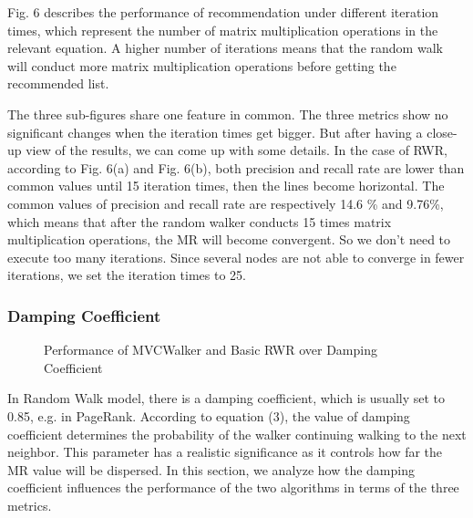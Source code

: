 \documentclass[10pt,journal,compsoc]{IEEEtran}
\begin{document}
Fig. 6 describes the performance of recommendation under different iteration times, which represent the number of matrix multiplication operations in the relevant equation. A higher number of iterations means that the random walk will conduct more matrix multiplication operations before getting the recommended list.

The three sub-figures share one feature in common. The three metrics show no significant changes when the iteration times get bigger. But after having a close-up view of the results, we can come up with some details. In the case of RWR, according to Fig. 6(a) and Fig. 6(b), both precision and recall rate are lower than common values until 15 iteration times, then the lines become horizontal. The common values of precision and recall rate are respectively 14.6 \% and 9.76\%, which means that after the random walker conducts 15 times matrix multiplication operations, the MR will become convergent. So we don't need to execute too many iterations. Since several nodes are not able to converge in fewer iterations, we set the iteration times to 25.

\subsubsection{Damping Coefficient}

\begin{figure}
\centering
{}
\caption{Performance of MVCWalker and Basic RWR over Damping Coefficient}
\label{fig:7}       %
\end{figure}
In Random Walk model, there is a damping coefficient, which is usually set to 0.85, e.g. in PageRank. According to equation (3), the value of damping coefficient determines the probability of the walker continuing walking to the next neighbor. This parameter has a realistic significance as it controls how far the MR value will be dispersed. In this section, we analyze how the damping coefficient influences the performance of the two algorithms in terms of the three metrics.
\end{document}
